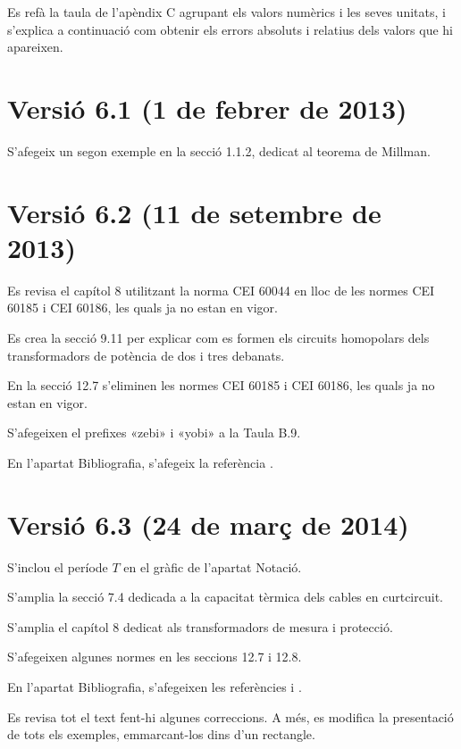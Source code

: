 Es refà la taula de l'apèndix C agrupant els valors numèrics i les seves unitats, i s'explica a continuació com obtenir els errors absoluts i relatius dels valors que hi apareixen.

\section*{Versió 6.1 (1 de febrer de 2013)}

S'afegeix un segon exemple en la secció 1.1.2, dedicat al teorema de Millman.


\section*{Versió 6.2 (11 de setembre de 2013)}

 Es revisa el capítol 8 utilitzant la norma CEI 60044 en lloc de les normes CEI 60185 i CEI 60186, les quals ja no estan en vigor.

Es crea la secció 9.11 per explicar com es formen els circuits homopolars dels transformadors de potència de dos i tres debanats.

En la secció 12.7 s'eliminen les normes CEI 60185 i CEI 60186, les quals ja no estan en vigor.

S'afegeixen el prefixes «zebi» i «yobi» a la Taula B.9.

En l'apartat Bibliografia, s'afegeix la referència \cite{RASe}.

\section*{Versió 6.3 (24 de març de 2014)}

S'inclou el període $T$ en el gràfic de l'apartat Notació.

S'amplia la secció 7.4 dedicada a la capacitat tèrmica dels cables en curtcircuit.

S'amplia el capítol 8 dedicat als transformadors de mesura i protecció.

S'afegeixen algunes normes en les seccions 12.7 i 12.8.

En l'apartat Bibliografia, s'afegeixen les referències \cite{KAS} i \cite{JCD}.

Es revisa tot el text fent-hi algunes correccions. A més, es modifica la presentació de tots els exemples, emmarcant-los dins d'un rectangle.


